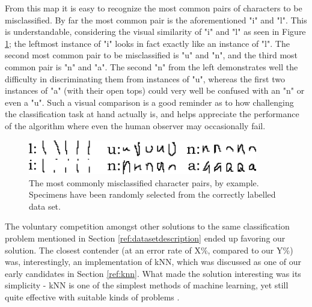 \documentclass{netsec2012}
\begin{document}
From this map it is easy to recognize the most common pairs of characters to be misclassified.  By
far the most common pair is the aforementioned "i" and "l".  This is understandable, considering the
visual similarity of "i" and "l" as seen in Figure \ref{fig:charpairs}; the leftmost instance of "i"
looks in fact exactly like an instance of "l".  The second most common pair to be misclassified is
"u" and "n", and the third most common pair is "n" and "a".  The second "n" from the left
demonstrates well the difficulty in discriminating them from instances of "u", whereas the first two
instances of "a" (with their open tops) could very well be confused with an "n" or even a "u".  Such
a visual comparison is a good reminder as to how challenging the classification task at hand
actually is, and helps appreciate the performance of the algorithm where even the human observer may
occasionally fail.

\begin{figure}[t]
\centering
\includegraphics[width=100mm]{pairs.png}
\caption{The most commonly misclassified character pairs, by example.  Specimens have been randomly
selected from the correctly labelled data set.}
\label{fig:charpairs}
\end{figure}

\label{ref:datachallenge}

The voluntary competition amongst other solutions to the same classification problem mentioned in
Section \ref{ref:datasetdescription} ended up favoring our solution.  The closest contender (at an
error rate of X\%, compared to our Y\%) was, interestingly, an implementation of kNN, which was
discussed as one of our early candidates in Section \ref{ref:knn}.  What made the solution
interesting was its simplicity - kNN is one of the simplest methods of machine learning, yet still
quite effective with suitable kinds of problems \cite{keller1985fuzzy}.

%
\end{document}
